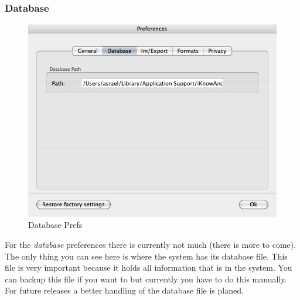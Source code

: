 \documentclass[12pt,a4]{article}
\begin{document}
\subsubsection{Database}
\label{prefs_database}
\medskip
% 
\begin{figure}[ht]
\begin{center}
\includegraphics[width=13.5cm]{images/Prefs_Database.png}
\end{center}
\caption{Database Prefs}
\label{image:databaseprefs}
\end{figure}
\noindent
%
For the \textit{database} preferences there is currently not much (there is more to come). The only thing you can see here is where the system has its database file. This file is very important because it holds all information that is in the system. You can backup this file if you want to but currently you have to do this manually. For future releases a better handling of the database file is planed.
\end{document}
